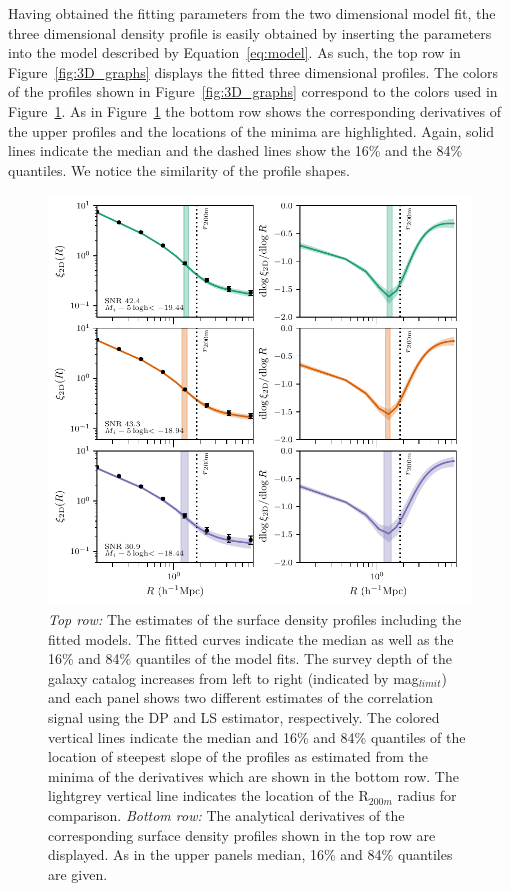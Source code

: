 \documentclass[a4paper,fleqn,usenatbib]{mnras}
\begin{document}
Having obtained the fitting parameters from the two dimensional model fit, the three dimensional density profile is easily obtained by inserting the parameters into the model described by Equation~\ref{eq:model}. As such, the top row in Figure~\ref{fig:3D_graphs} displays the fitted three dimensional profiles. The colors of the profiles shown in Figure~\ref{fig:3D_graphs} correspond to the colors used in Figure~\ref{fig:2D_graphs}. As in Figure~\ref{fig:2D_graphs} the bottom row shows the corresponding derivatives of the upper profiles and the locations of the minima are highlighted. Again, solid lines indicate the median and the dashed lines show the 16\% and the 84\% quantiles. We notice the similarity of the profile shapes.

\begin{figure}
    \includegraphics[width= \textwidth]{2D_graphs.pdf}
\caption{\textit{Top row: }The estimates of the surface density profiles including the fitted models. The fitted curves indicate the median as well as the 16\% and 84\% quantiles of the model fits. The survey depth of the galaxy catalog increases from left to right (indicated by mag$_{limit}$) and each panel shows two different estimates of the correlation signal using the DP and LS estimator, respectively. The colored vertical lines indicate the median and 16\% and 84\% quantiles of the location of steepest slope of the profiles as estimated from the minima of the derivatives which are shown in the bottom row. The lightgrey vertical line indicates the location of the R$_{200m}$ radius for comparison. \textit{Bottom row: } The analytical derivatives of the corresponding surface density profiles shown in the top row are displayed. As in the upper panels median, 16\% and 84\% quantiles are given.}
   \label{fig:2D_graphs}
\end{figure}
\end{document}
